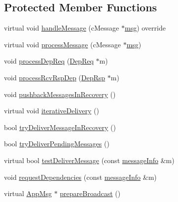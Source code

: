 \subsection*{Protected Member Functions}
\begin{DoxyCompactItemize}
\item 
virtual void \hyperlink{classNodeWithRecovery_a901c89606b84898e13fe8a66228acd9f}{handle\+Message} (c\+Message $\ast$\hyperlink{Controller_8h_afa0f3b802fbc219228f7bb97996fa558}{msg}) override
\item 
virtual void \hyperlink{classNodeWithRecovery_a216c29d76ddb0e94cd5701ff208c7f5b}{process\+Message} (c\+Message $\ast$\hyperlink{Controller_8h_afa0f3b802fbc219228f7bb97996fa558}{msg})
\item 
void \hyperlink{classNodeWithRecovery_a52ef51093d41e9b337987810311a7bc6}{process\+Dep\+Req} (\hyperlink{classDepReq}{Dep\+Req} $\ast$m)
\item 
void \hyperlink{classNodeWithRecovery_a34b5b66f90d85dd84b237b8cf81f2f7e}{process\+Rcv\+Rsp\+Dep} (\hyperlink{classDepRsp}{Dep\+Rsp} $\ast$m)
\item 
void \hyperlink{classNodeWithRecovery_a261e41c94a93113168f8f81411b7c100}{pushback\+Messages\+In\+Recovery} ()
\item 
virtual void \hyperlink{classNodeWithRecovery_a9b61912f38b62452584dc80bf261ef4e}{iterative\+Delivery} ()
\item 
bool \hyperlink{classNodeWithRecovery_a87a1ce8071c9c587b878636f79163e7e}{try\+Deliver\+Message\+In\+Recovery} ()
\item 
bool \hyperlink{classNodeWithRecovery_a462d825601a3c85ee4ef95be673790f8}{try\+Deliver\+Pending\+Messages} ()
\item 
virtual bool \hyperlink{classNodeWithRecovery_aec147b3723b3dab00f9610453ba8daba}{test\+Deliver\+Message} (const \hyperlink{structures_8h_a7e7bdc1d2fff8a9436f2f352b2711ed6}{message\+Info} \&m)
\item 
void \hyperlink{classNodeWithRecovery_a8b16bbc948fddc744a55ac548348a988}{request\+Dependencies} (const \hyperlink{structures_8h_a7e7bdc1d2fff8a9436f2f352b2711ed6}{message\+Info} \&m)
\item 
virtual \hyperlink{classAppMsg}{App\+Msg} $\ast$ \hyperlink{classNodeWithRecovery_a33d8e8775fd69cb647b38a54b36e1ebe}{prepare\+Broadcast} ()
\end{DoxyCompactItemize}
